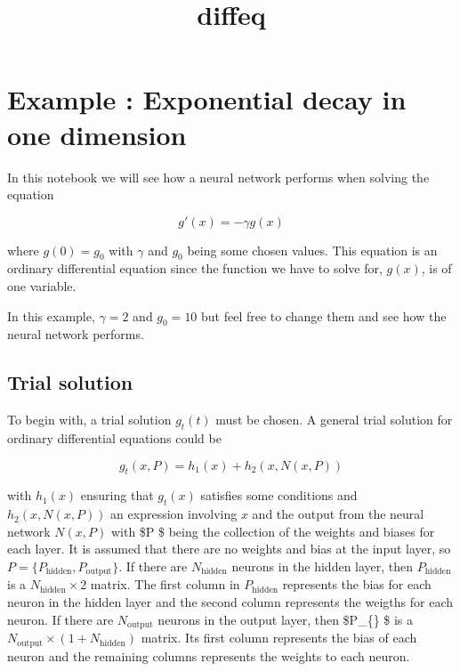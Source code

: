 \documentclass[11pt]{article}
\title{diffeq}
\begin{document}
    
    
    \maketitle
    
    

    
    

    \hypertarget{example-exponential-decay-in-one-dimension}{%
\section{Example : Exponential decay in one
dimension}\label{example-exponential-decay-in-one-dimension}}

In this notebook we will see how a neural network performs when solving
the equation

\[
\label{eq:ode}
g'(x) = -\gamma g(x) 
\]

where \(g(0) = g_0\) with \(\gamma\) and \(g_0\) being some chosen
values. This equation is an ordinary differential equation since the
function we have to solve for, \(g(x)\), is of one variable.

In this example, \(\gamma = 2\) and \(g_0 = 10\) but feel free to change
them and see how the neural network performs.

\hypertarget{trial-solution}{%
\subsection{Trial solution}\label{trial-solution}}

To begin with, a trial solution \(g_t(t)\) must be chosen. A general
trial solution for ordinary differential equations could be

\[
g_t(x, P) = h_1(x) + h_2(x, N(x, P))
\]

with \(h_1(x)\) ensuring that \(g_t(x)\) satisfies some conditions and
\(h_2(x,N(x, P))\) an expression involving \(x\) and the output from the
neural network \(N(x,P)\) with \$P \$ being the collection of the
weights and biases for each layer. It is assumed that there are no
weights and bias at the input layer, so
\(P = \{ P_{\text{hidden}}, P_{\text{output}} \}\). If there are
\(N_{\text{hidden} }\) neurons in the hidden layer, then
\(P_{\text{hidden}}\) is a \(N_{\text{hidden} } \times 2\) matrix. The
first column in \(P_{\text{hidden} }\) represents the bias for each
neuron in the hidden layer and the second column represents the weigths
for each neuron. If there are \(N_{\text{output} }\) neurons in the
output layer, then \$P\_\{\} \$ is a
\(N_{\text{output} } \times (1 + N_{\text{hidden} })\) matrix. Its first
column represents the bias of each neuron and the remaining columns
represents the weights to each neuron.
\end{document}
